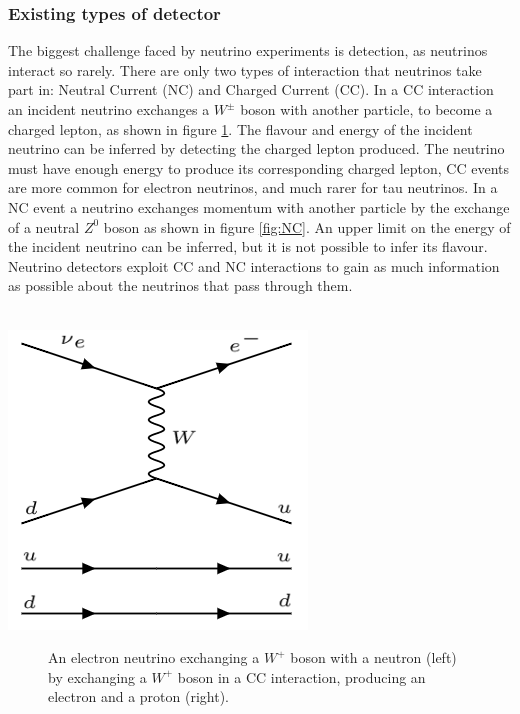 \documentclass[12pt]{article}
\begin{document}
\subsubsection{Existing types of detector}
The biggest challenge faced by neutrino experiments is detection, as neutrinos interact so rarely. There are only two types of interaction that neutrinos take part in: Neutral Current (NC) and Charged Current (CC). In a CC interaction an incident neutrino exchanges a $W^{\pm}$ boson with another particle, to become a charged lepton, as shown in figure \ref{fig:CC}. The flavour and energy of the incident neutrino can be inferred by detecting the charged lepton produced. The neutrino must have enough energy to produce its corresponding charged lepton, CC events are more common for electron neutrinos, and much rarer for tau neutrinos. In a NC event a neutrino exchanges momentum with another particle by the exchange of a neutral $Z^0$ boson as shown in figure \ref{fig:NC}. An upper limit on the energy of the incident neutrino can be inferred, but it is not possible to infer its flavour. Neutrino detectors exploit CC and NC interactions to gain as much information as possible about the neutrinos that pass through them.\\\\
\begin{center}
\includegraphics[scale=0.4]{CC.png}
\begin{figure}[h!]
\caption{An electron neutrino exchanging a $W^+$ boson with a neutron (left) by exchanging a $W^+$ boson in a CC interaction, producing an electron and a proton (right).}
\label{fig:CC}
\end{figure}
\end{center}
\end{document}

